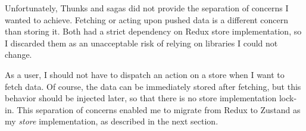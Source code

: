 Unfortunately,
Thunks and sagas did not provide the separation of concerns
I wanted to achieve.
Fetching or acting upon pushed data
is a different concern than storing it.
Both had a strict dependency on Redux
store implementation,
so I discarded them as an unacceptable risk
of relying on libraries I could not change.

As a user,
I should not have to dispatch an action on a store
when I want to fetch data.
Of course, the data can be immediately stored after fetching,
but this behavior should be injected later,
so that there is no store implementation lock-in.
This separation of concerns enabled me to
migrate from Redux to Zustand as my \textit{store} implementation,
as described in the next section.
